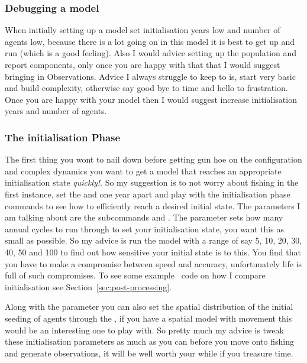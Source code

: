 \subsubsection*{Debugging a model}
When initially setting up a model set initialisation years low and number of agents low, because there is a lot going on in this model it is best to get up and run (which is a good feeling). Also I would advice setting up the population and report components, only once you are happy with that that I would suggest bringing in Observations. Advice I always struggle to keep to is, start very basic and build complexity, otherwise say good bye to time and hello to frustration. Once you are happy with your model then I would suggest increase initialisation years and number of agents.

\subsubsection*{The initialisation Phase}
The first thing you wont to nail down before getting gun hoe on the configuration and complex dynamics you want to get a model that reaches an appropriate initialisation state \emph{quickly!}. So my suggestion is to not worry about fishing in the first instance, set the  and  one year apart and play with the initialisation phase commands to see how to efficiently reach a desired initial state. The parameters I am talking about are the subcommands  and . The  parameter sets how many annual cycles to run through to set your initialisation state, you want this as small as possible. So my advice is run the model with a range of  say 5, 10, 20, 30, 40, 50 and 100 to find out how sensitive your initial state is to this. You find that you have to make a compromise between speed and accuracy, unfortunately life is full of such compromises. To see some example \R\ code on how I compare initialisation see Section~\ref{sec:post-processing}.

Along with the  parameter you can also set the spatial distribution of the initial seeding of agents through the , if you have a spatial model with movement this would be an interesting one to play with. So pretty much my advice is tweak these initialisation parameters as much as you can before you move onto fishing and generate observations, it will be well worth your while if you treasure time.

